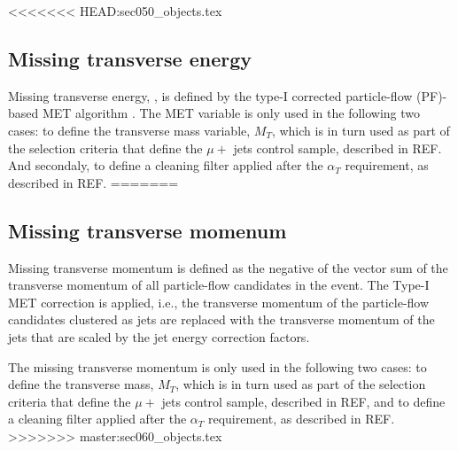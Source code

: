<<<<<<< HEAD:sec050_objects.tex
\subsection{Missing transverse energy}
\label{sec:MET}
Missing transverse energy,  , is defined by the type-I corrected particle-flow (PF)-based MET algorithm \cite{met-corrections}. The MET variable is only used in the following two cases: to define the transverse mass variable, $M_{T}$, which is in turn used as part of the selection criteria that define the $\mu +$ jets control sample, described in REF. And secondaly, to define a cleaning filter applied after the $\alpha_{T}$ requirement, as described in REF. 
=======
\subsection{Missing transverse momenum}

Missing transverse momentum is defined as the negative of the vector sum
of the transverse momentum of all particle-flow candidates in the event.
The Type-I MET correction is applied, i.e., the transverse momentum of
the particle-flow candidates clustered as jets are replaced with the
transverse momentum of the jets that are scaled by the jet energy
correction factors.

The missing transverse momentum is only used in the following two cases:
to define the transverse mass, $M_{T}$, which is in turn used as part of
the selection criteria that define the $\mu +$ jets control sample,
described in REF, and to define a cleaning filter applied after the
$\alpha_{T}$ requirement, as described in REF.
>>>>>>> master:sec060_objects.tex


